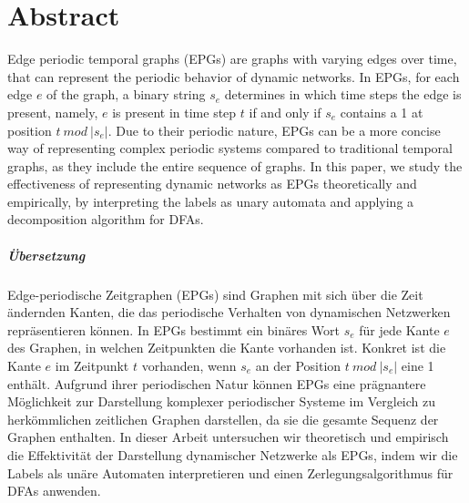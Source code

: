 \chapter*{Abstract}
Edge periodic temporal graphs (EPGs) are graphs with varying edges over time, that can represent the periodic behavior of dynamic networks. In EPGs, for each edge $e$ of the graph, a binary string $s_e$ determines in which time steps the edge is present, namely, $e$ is present in time step $t$ if and only if $s_e$ contains a 1 at position $t~ mod~ |s_e|$. Due to their periodic nature, EPGs can be a more concise way of representing complex periodic systems compared to traditional temporal graphs, as they include the entire sequence of graphs. In this paper, we study the effectiveness of representing dynamic networks as EPGs theoretically and empirically, by interpreting the labels as unary automata and applying a decomposition algorithm for DFAs.

\paragraph{Übersetzung}
Edge-periodische Zeitgraphen (EPGs) sind Graphen mit sich über die Zeit ändernden Kanten, die das periodische Verhalten von dynamischen Netzwerken repräsentieren können. In EPGs bestimmt ein binäres Wort $s_e$ für jede Kante $e$ des Graphen, in welchen Zeitpunkten die Kante vorhanden ist. Konkret ist die Kante $e$ im Zeitpunkt $t$ vorhanden, wenn $s_e$ an der Position $t~ mod~ |s_e|$ eine 1 enthält. Aufgrund ihrer periodischen Natur können EPGs eine prägnantere Möglichkeit zur Darstellung komplexer periodischer Systeme im Vergleich zu herkömmlichen zeitlichen Graphen darstellen, da sie die gesamte Sequenz der Graphen enthalten. In dieser Arbeit untersuchen wir theoretisch und empirisch die Effektivität der Darstellung dynamischer Netzwerke als EPGs, indem wir die Labels als unäre Automaten interpretieren und einen Zerlegungsalgorithmus für DFAs anwenden.